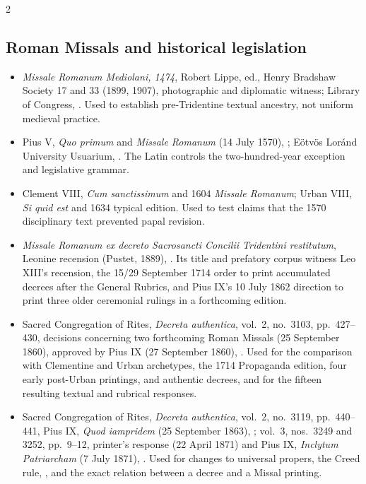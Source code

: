 \begin{multicols}{2}
\subsection*{Roman Missals and historical legislation}

\begin{itemize}[itemsep=0.12em,topsep=0.15em]
\item \emph{Missale Romanum Mediolani, 1474}, Robert Lippe, ed., Henry Bradshaw Society 17 and 33 (1899, 1907), photographic and diplomatic witness; Library of Congress, . Used to establish pre-Tridentine textual ancestry, not uniform medieval practice.
\item Pius V, \emph{Quo primum} and \emph{Missale Romanum} (14 July 1570), ; Eötvös Loránd University Usuarium, . The Latin controls the two-hundred-year exception and legislative grammar.
\item Clement VIII, \emph{Cum sanctissimum} and 1604 \emph{Missale Romanum}; Urban VIII, \emph{Si quid est} and 1634 typical edition. Used to test claims that the 1570 disciplinary text prevented papal revision.
\item \emph{Missale Romanum ex decreto Sacrosancti Concilii Tridentini restitutum}, Leonine recension (Pustet, 1889), . Its title and prefatory corpus witness Leo XIII's recension, the 15/29 September 1714 order to print accumulated decrees after the General Rubrics, and Pius IX's 10 July 1862 direction to print three older ceremonial rulings in a forthcoming edition.
\item Sacred Congregation of Rites, \emph{Decreta authentica}, vol.~2, no.~3103, pp.~427--430, decisions concerning two forthcoming Roman Missals (25 September 1860), approved by Pius IX (27 September 1860), . Used for the comparison with Clementine and Urban archetypes, the 1714 Propaganda edition, four early post-Urban printings, and authentic decrees, and for the fifteen resulting textual and rubrical responses.
\item Sacred Congregation of Rites, \emph{Decreta authentica}, vol.~2, no.~3119, pp.~440--441, Pius IX, \emph{Quod iampridem} (25 September 1863), ; vol.~3, nos.~3249 and 3252, pp.~9--12, printer's response (22 April 1871) and Pius IX, \emph{Inclytum Patriarcham} (7 July 1871), . Used for changes to universal propers, the Creed rule, , and the exact relation between a decree and a Missal printing.

\end{itemize}
\end{multicols}
